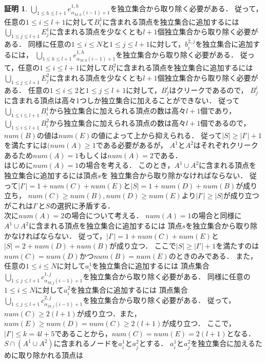 \documentclass[12pt]{thesis}
\theoremstyle{definition}
\newtheorem*{prf*}{証明}
\begin{document}
\begin{prf*}
$\bigcup_{1\leq h \leq l+1} e^{1,h}_{\alpha_{M,h}(i-1)+1}$を独立集合から取り除く必要がある．
従って，任意の$1\leq i \leq l+1$に対して$B^{1}_{i}$に含まれる頂点を独立集合に追加するには
$\bigcup_{1\leq j \leq l+1}E^{1}_{j}$に含まれる頂点を少なくとも$l+1$個独立集合から取り除く必要がある．
同様に任意の$1\leq i \leq N$と$1\leq j \leq l+1$に対して，$b^{2,j}_{i}$を独立集合に追加するには，
$\bigcup_{1\leq h \leq l+1} e^{1,h}_{\alpha_{M,h}(i-1)+1}$を独立集合から取り除く必要がある．
従って，任意の$1\leq i \leq l+1$に対して$B^{2}_{i}$に含まれる頂点を独立集合に追加するには
$\bigcup_{1\leq j \leq l+1}E^{2}_{j}$に含まれる頂点を少なくとも$l+1$個独立集合から取り除く必要がある．
任意の$1\leq i \leq 2$と$1\leq j \leq l+1$に対して，$B^{i}_{j}$はクリークであるので，
$B^{i}_{j}$に含まれる頂点は高々1つしか独立集合に加えることができない．
従って$\bigcup_{1\leq i \leq l+1}B^{1}_{i}$から独立集合に加えられる頂点の数は高々$l+1$個であり，
$\bigcup_{1\leq i \leq l+1}B^{2}_{i}$から独立集合に加えられる頂点の数は高々$l+1$個であるので，
$num(B)$の値は$num(E)$の値によって上から抑えられる．
従って$|S|\geq |I'|+1$を満たすには$(num(A) \geq 1$である必要があるが，
$A^{1}$と$A^{2}$はそれぞれクリークあるため$num(A) = 1$もしくは$num(A) = 2$である．\\
はじめに$num(A)=1$の場合を考える．
このとき，$A^{1} \cup A^{2}$に含まれる頂点を独立集合に追加するには頂点$s$を
独立集合から取り除かなければならない．
従って$|I'|=1+num(C)+num(E)$と$|S|=1+num(D)+num(B)$が成り立ち，
$num(C)\geq num(B), num(D)\geq num(E)$より$|I'|\geq |S|$が成り立つがこれは$I'$と$S$の選択に矛盾する．\\
次に$num(A)=2$の場合について考える．
$num(A)=1$の場合と同様に$A^{1} \cup A^{2}$に含まれる頂点を独立集合に追加するには
頂点$s$を独立集合から取り除かなければならない．
従って，$|I'|=1+num(C)+num(E)$と$|S|=2+num(D)+num(B)$が成り立つ．
ここで$|S| \geq |I'|+1$を満たすのは$num(C)=num(D)$かつ$num(B)=num(E)$のときのみである．
また，任意の$1\leq i \leq N$に対して$a^{1}_{i}$を独立集合に追加するには
頂点集合$\bigcup_{1\leq j \leq l+1} c^{1,j}_{\alpha_{M,j}(i-1)+1}$を独立集合から取り除く必要がある．
同様に任意の$1\leq i \leq N$に対して$a^{2}_{i}$を独立集合に追加するには
頂点集合$\bigcup_{1\leq j \leq l+1} c^{2,j}_{\alpha_{M,j}(i-1)+1}$を独立集合から取り除く必要がある．
従って，$num(C) \geq 2 (l+1)$が成り立つ．また，$num(E)\geq num(D)=num(C) \geq 2(l+1)$が成り立つ．
ここで，$|I'|\leq k=4l+5$であることから，$num(C)=num(E)=2(l+1)$となる． \\
$S \cap (A^{1}\cup A^{2})$に含まれるノードを$a^{1}_{i}$と$a^{2}_{j}$とする．
$a^{1}_{i}$と$a^{2}_{j}$を独立集合に加えるために取り除かれる頂点は

\end{prf*}
\end{document}
